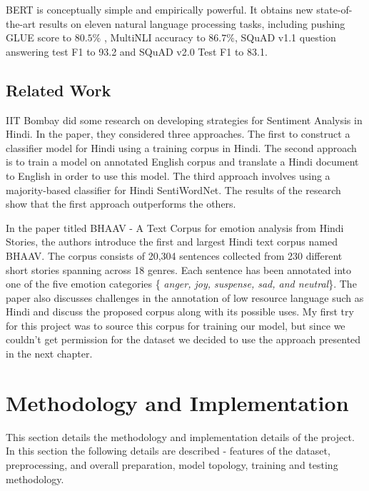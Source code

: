 \documentclass[a4paper, 12pt]{article}
\begin{document}
\begin{sloppypar}
BERT is conceptually simple and empirically powerful. It obtains new state-of-the-art results on eleven natural language processing tasks, including pushing GLUE\cite{wang_glue_2018}
 score to $80.5 \%$ , MultiNLI\cite{williams_broad-coverage_2018}
accuracy to $86.7\%$, SQuAD v1.1\cite{rajpurkar_squad_2016}
question answering test F1 to 93.2  and SQuAD v2.0\cite{rajpurkar_squad_2016}
Test F1 to 83.1.\cite{devlin_bert_2019}

\subsection{Related Work}

IIT Bombay did some research on developing strategies  for Sentiment Analysis in Hindi.  In the paper, they considered three approaches. The first to construct a classifier model for Hindi using a training corpus in Hindi. The second approach is to train a model on annotated English corpus and translate a Hindi document to English in order to use this model. The third approach involves using a majority-based classifier for Hindi SentiWordNet. The results of the research show that the first approach outperforms the others.\cite{joshi_fall-back_nodate}

In the paper titled BHAAV - A Text Corpus for emotion analysis from Hindi Stories, the authors introduce the first and largest Hindi text corpus named BHAAV. The corpus consists of 20,304 sentences collected from 230 different short stories spanning across 18 genres. Each sentence has been annotated into one of the five emotion categories \{ \textit{anger, joy, suspense, sad, and neutral}\}. The paper also discusses challenges in the annotation of low resource language such as Hindi and discuss the proposed corpus along with its possible uses.\cite{kumar_bhaav_2019}
My first try for this project was to source this corpus for training our model, but since we couldn't get permission for the dataset we decided to use the approach presented in the next chapter.
\clearpage
\section{Methodology and Implementation}

This section details the methodology and implementation details of the project. In this section the following details are described -  features of the dataset, preprocessing, and overall preparation, model topology, training and testing methodology.


\end{sloppypar}
\end{document}
